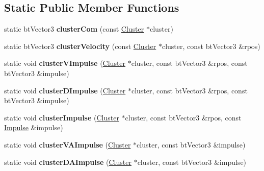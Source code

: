 \subsection*{Static Public Member Functions}
\begin{DoxyCompactItemize}
\item 
\hypertarget{classbt_soft_body_a8a4ea1cf74b8b8e08733d3f0fb466ded}{static bt\+Vector3 {\bfseries cluster\+Com} (const \hyperlink{structbt_soft_body_1_1_cluster}{Cluster} $\ast$cluster)}\label{classbt_soft_body_a8a4ea1cf74b8b8e08733d3f0fb466ded}

\item 
\hypertarget{classbt_soft_body_ab6ae110bfb643bda929c67a59cf6b83f}{static bt\+Vector3 {\bfseries cluster\+Velocity} (const \hyperlink{structbt_soft_body_1_1_cluster}{Cluster} $\ast$cluster, const bt\+Vector3 \&rpos)}\label{classbt_soft_body_ab6ae110bfb643bda929c67a59cf6b83f}

\item 
\hypertarget{classbt_soft_body_a546e7f4e94c6b75f7e4eecada5b956e7}{static void {\bfseries cluster\+V\+Impulse} (\hyperlink{structbt_soft_body_1_1_cluster}{Cluster} $\ast$cluster, const bt\+Vector3 \&rpos, const bt\+Vector3 \&impulse)}\label{classbt_soft_body_a546e7f4e94c6b75f7e4eecada5b956e7}

\item 
\hypertarget{classbt_soft_body_ab3cfd805f7fddd63db5f966c3d1cbb1b}{static void {\bfseries cluster\+D\+Impulse} (\hyperlink{structbt_soft_body_1_1_cluster}{Cluster} $\ast$cluster, const bt\+Vector3 \&rpos, const bt\+Vector3 \&impulse)}\label{classbt_soft_body_ab3cfd805f7fddd63db5f966c3d1cbb1b}

\item 
\hypertarget{classbt_soft_body_aad6406f1e55d95ba092ed2f51a992b72}{static void {\bfseries cluster\+Impulse} (\hyperlink{structbt_soft_body_1_1_cluster}{Cluster} $\ast$cluster, const bt\+Vector3 \&rpos, const \hyperlink{structbt_soft_body_1_1_impulse}{Impulse} \&impulse)}\label{classbt_soft_body_aad6406f1e55d95ba092ed2f51a992b72}

\item 
\hypertarget{classbt_soft_body_a7bfd5a6382e9f1d35ff2b6a2e90d2fbc}{static void {\bfseries cluster\+V\+A\+Impulse} (\hyperlink{structbt_soft_body_1_1_cluster}{Cluster} $\ast$cluster, const bt\+Vector3 \&impulse)}\label{classbt_soft_body_a7bfd5a6382e9f1d35ff2b6a2e90d2fbc}

\item 
\hypertarget{classbt_soft_body_a6222d3a234f2776c398084a673f6a35f}{static void {\bfseries cluster\+D\+A\+Impulse} (\hyperlink{structbt_soft_body_1_1_cluster}{Cluster} $\ast$cluster, const bt\+Vector3 \&impulse)}\label{classbt_soft_body_a6222d3a234f2776c398084a673f6a35f}


\end{DoxyCompactItemize}
